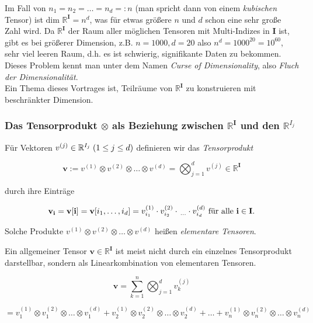 \documentclass[11pt]{article} %
\begin{document}
\begin{changemargin}{0pt}{0pt}
\begin{rmk}
Im Fall von $n_{1} = n_{2} = \dots = n_{d} =: n$ (man spricht dann von einem \textit{kubischen} Tensor) ist
$\text{dim } \mathbb{R}^{\mathbf{I}} = n^{d}$, was für etwas größere $n$ und $d$ schon
eine sehr große Zahl wird. Da $\mathbb{R}^{\mathbf{I}}$ der Raum aller möglichen Tensoren mit Multi-Indizes in $\mathbf{I}$ ist, gibt es bei
größerer Dimension, z.B. $n = 1000, d = 20$ also $n^{d} = 1000^{20} = 10^{60}$, sehr viel leeren Raum, d.h. es ist schwierig, signifikante Daten zu
bekommen. Dieses Problem kennt man unter dem Namen \textit{Curse of Dimensionality}, also \textit{Fluch der Dimensionalität}.\\
Ein Thema dieses Vortrages ist, Teilräume von $\mathbb{R}^{\mathbf{I}}$ zu konstruieren mit beschränkter Dimension.
\end{rmk}
\end{changemargin}

\newpage
\subsubsection{Das Tensorprodukt $\otimes$ als Beziehung zwischen $\mathbb{R}^{\mathbf{I}}$ und den $\mathbb{R}^{I_{j}}$}
\begin{changemargin}{0pt}{0pt}

\begin{definition}
Für Vektoren $v^{(j)} \in \mathbb{R}^{I_{j}} \hspace{1mm}(1 \leq j \leq d)$ definieren wir das \textit{Tensorprodukt}

\[\mathbf{v} := v^{(1)} \otimes v^{(2)} \otimes \dots \otimes v^{(d)} = \bigotimes^{d}_{j=1} v^{(j)} \in \mathbb{R}^{\mathbf{I}}\]

durch ihre Einträge

\begin{equation} \label{eq:1.2}
\mathbf{v}_{\mathbf{i}} = \mathbf{v}[\mathbf{i}] = \mathbf{v}[i_{1},\dots,i_{d}] 
= v^{(1)}_{i_{1}} \cdot  v^{(2)}_{i_{2}} \cdot \hspace{0.5mm}_{\dots} \cdot  v^{(d)}_{i_{d}} \text{ für alle } \mathbf{i} \in \mathbf{I}.
\end{equation}

Solche Produkte $v^{(1)} \otimes v^{(2)} \otimes \dots \otimes v^{(d)}$ heißen \textit{elementare Tensoren}.
\end{definition}

Ein allgemeiner Tensor $\mathbf{v} \in \mathbb{R}^{\mathbf{I}}$ ist meist nicht durch ein einzelnes Tensorprodukt darstellbar,
sondern als Linearkombination von elementaren Tensoren.

\[ \mathbf{v} = \sum_{k=1}^{n} \bigotimes_{j=1}^{d} v^{(j)}_{k}\]

\[= v_{1}^{(1)} \otimes v_{1}^{(2)} \otimes \dots \otimes v_{1}^{(d)} + v_{2}^{(1)} \otimes v_{2}^{(2)} \otimes
\dots \otimes v_{2}^{(d)} +\dots
+v_{n}^{(1)} \otimes v_{n}^{(2)} \otimes \dots \otimes v_{n}^{(d)}  \]

\end{changemargin}
\end{document}
